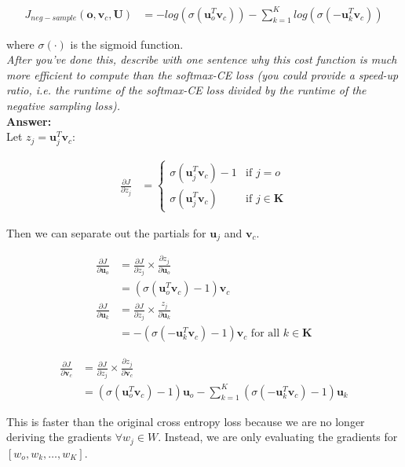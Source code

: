 \documentclass[fleqn]{MJD}
\newcommand{\0}{\emptyset}
\begin{document}
\begin{align}
	J_{neg-sample}(\bm{o}, \bm{v}_{c}, \bm{U}) &= %
		− log(\sigma(\bm{u}_{o}^{T} \bm{v}_{c})) - \sum\limits_{k=1}^{K} log(\sigma(-\bm{u}_{k}^{T} \bm{v}_{c}))
\end{align}

\noindent where $\sigma(\cdot)$ is the sigmoid function. \\

\noindent \textit{After you’ve done this, describe with one sentence why this cost function is much more efficient to compute than the softmax-CE loss (you could provide a speed-up ratio, i.e. the runtime of the softmax-CE loss divided by the runtime of the negative sampling loss).} \\


\noindent \textbf{Answer:} \\

\noindent Let $z_{j} = \bm{u}_{j}^{T} \bm{v}_{c}$:

\begin{align}
	\frac{\partial J}{\partial z_{j}} &= %
		\left\{
			\begin{array}{ll}
				 \sigma(\bm{u}_{j}^{T} \bm{v}_{c}) - 1 & \mbox{if } j = o \\ 
				 \sigma(\bm{u}_{j}^{T} \bm{v}_{c}) 	   & \mbox{if } j \in \bm{K}
			\end{array}
		\right. \nonumber 
\end{align}

\noindent Then we can separate out the partials for $\bm{u}_{j}$ and $\bm{v}_{c}$.

\begin{align}
	\frac{\partial J}{\partial \bm{u}_{o}} &= %
		\frac{\partial J}{\partial z_{j}} \times %
			\frac{ \partial z_{j} }{ \partial \bm{u}_{o} } \nonumber \\
		&= (\sigma(\bm{u}_{o}^{T} \bm{v}_{c}) - 1) \bm{v}_{c} \nonumber \\
	\frac{\partial J}{\partial \bm{u}_{k}} &= %
			\frac{\partial J}{\partial z_{j}} \times %
				\frac{ z_{j} }{ \partial \bm{u}_{k} } \nonumber \\
		&= -(\sigma(-\bm{u}_{k}^{T} \bm{v}_{c}) - 1) \bm{v}_{c} \mbox{  for all } k \in \bm{K} \nonumber
\end{align}

\begin{align}
	\frac{\partial J}{\partial \bm{v}_{c}} &= %
		\frac{\partial J}{\partial z_{j}} \times %
			\frac{ \partial z_{j}}{ \partial \bm{v}_{c} } \nonumber \\
		&= (\sigma(\bm{u}_{o}^{T} \bm{v}_{c}) -1) \bm{u}_{o} - %
			\sum\limits_{k=1}^{K} (\sigma(- \bm{u}_{k}^{T} \bm{v}_{c}) - 1) \bm{u}_{k} \nonumber
\end{align}


\noindent This is faster than the original cross entropy loss because we are no longer deriving the gradients $\forall w_{j} \in W$. Instead, we are only evaluating the gradients for $[w_{o}, w_{k},\dots,w_{K}]$. 
\end{document}
